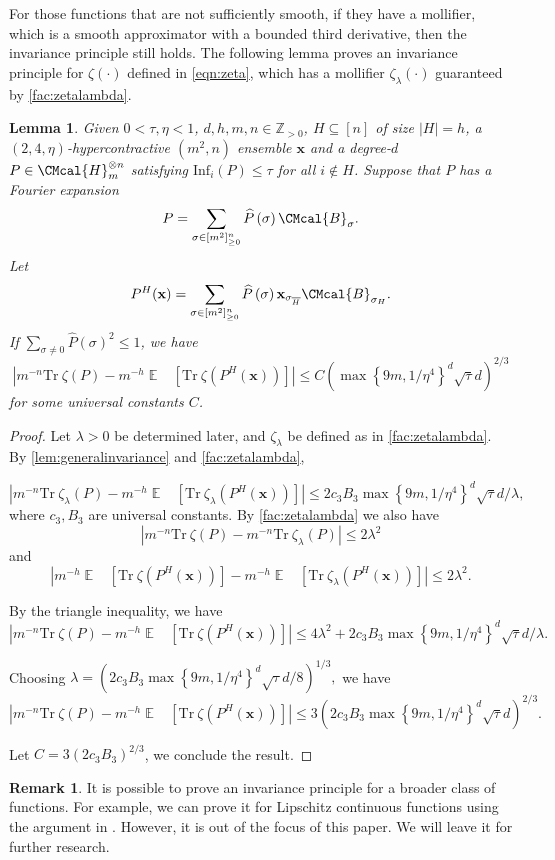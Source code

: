 \documentclass[11pt]{article}
\def\B{\CMcal{B}}
\def\H{\CMcal{H}}
\theoremstyle{plain}
\newtheorem{lemma}[theorem]{Lemma}
\theoremstyle{definition}
\newtheorem{remark}[theorem]{Remark}
\newcommand {\minusspace} {\: \! \!}
\newcommand {\Fn} [2] {\ensuremath{ #1 \minusspace \Br{ #2 } }}
\newcommand {\set} [1] {\ensuremath{ \left\lbrace #1 \right\rbrace }}
\newcommand {\br} [1] {\ensuremath{ \left( #1 \right) }}
\newcommand {\Br} [1] {\ensuremath{ \left[ #1 \right] }}
\newcommand {\ab} [1] {\ensuremath{ \left| #1 \right| }}
\DeclareMathOperator*{\bigE}{\mathbb{E}}
\newcommand {\expec} [2] {\Fn{\bigE_{\substack{#1}}}{#2}}
\newcommand {\Tr} {\ensuremath{ \mathrm{Tr} }}
\newcommand{\posint}{{\mathbb Z}_{>0}}
\newcommand{\randx}{\ensuremath{\mathbf{x}}}
\newcommand{\infi}[1]{\ensuremath{\mathrm{Inf}_i}\br{#1}}
\newcommand{\sigmarange}[1]{\ensuremath{\sigma\in[m^2]_{\geq0}^{#1}}}
\newcommand{\1}{\mathbb{1}} %
\begin{document}
For those functions that are not sufficiently smooth, if they have a mollifier, which is a smooth approximator with a bounded third derivative, then the invariance principle still holds. The following lemma proves an invariance principle for $\zeta\br{\cdot}$ defined in \cref{eqn:zeta}, which has a mollifier $\zeta_{\lambda}\br{\cdot}$ guaranteed by \cref{fac:zetalambda}.

\begin{lemma}\label{lem:zetainvariance}
	Given $0<\tau,\eta<1$, $d,h,m,n\in\posint$, $H\subseteq[n]$ of size $\ab{H}=h$, a $(2,4,\eta)$-hypercontractive  $(m^2,n)$ ensemble $\randx$ and a degree-$d$ $P\in\H_m^{\otimes n}$ satisfying $\infi{P}\leq\tau$ for all $i\notin H$. Suppose that $P$ has a Fourier expansion
	\[P=\sum_{\sigmarange{n}}\widehat{P}\br{\sigma}\B_\sigma.\]
	Let
	\[P^H(\randx)=\sum_{\sigmarange{n}}\widehat{P}\br{\sigma}\randx_{\sigma_{\overline{H}}}\B_{\sigma_H}.\]
	If $\sum_{\sigma\ne0}\widehat{P}\br{\sigma}^2\leq1$, we have
	\[\ab{m^{-n}\Tr~\zeta\br{P}-m^{-h}\expec{}{\Tr~\zeta\br{P^H(\randx)}}}\leq C\br{\max\set{9m,1/\eta^4}^d\sqrt{\tau}d}^{2/3}\]
	for some universal constants $C$.
\end{lemma}

\begin{proof}
Let $\lambda>0$ be determined later, and $\zeta_\lambda$ be defined as in \cref{fac:zetalambda}. By \cref{lem:generalinvariance} and \cref{fac:zetalambda},

\[\ab{m^{-n}\Tr~\zeta_\lambda\br{P}-m^{-h}\expec{}{\Tr~\zeta_\lambda\br{P^H(\randx)}}}\leq 2c_3 B_3 \max\set{9m,1/\eta^4}^d\sqrt{\tau}d/\lambda,\]
where $c_3,B_3$ are universal constants. By \cref{fac:zetalambda} we also have
\[\ab{m^{-n}\Tr~\zeta\br{P}-m^{-n}\Tr~\zeta_\lambda\br{P}}\leq 2\lambda^2\]
and
\[\ab{m^{-h}\expec{}{\Tr~\zeta\br{P^H(\randx)}}-m^{-h}\expec{}{\Tr~\zeta_\lambda\br{P^H(\randx)}}}\leq 2\lambda^2.\]

By the triangle inequality, we have
\[\ab{m^{-n}\Tr~\zeta\br{P}-m^{-h}\expec{}{\Tr~\zeta\br{P^H(\randx)}}}\leq4\lambda^2+2c_3 B_3 \max\set{9m,1/\eta^4}^d\sqrt{\tau}d/\lambda.\]

Choosing $\lambda=\br{2c_3 B_3 \max\set{9m,1/\eta^4}^d\sqrt{\tau}d/8}^{1/3},$ we have
\[\ab{m^{-n}\Tr~\zeta\br{P}-m^{-h}\expec{}{\Tr~\zeta\br{P^H(\randx)}}}\leq3\br{2c_3 B_3 \max\set{9m,1/\eta^4}^d\sqrt{\tau}d}^{2/3}.\]

Let $C=3\br{2c_3B_3}^{2/3}$, we conclude the result.
\end{proof}

\begin{remark}
It is possible to prove an invariance principle for a broader class of functions. For example, we can prove it for Lipschitz continuous functions using the argument in \cite[Lemma 3.5]{isaksson2012maximally}. However, it is out of the focus of this paper. We will leave it for further research.
\end{remark}
\end{document}
